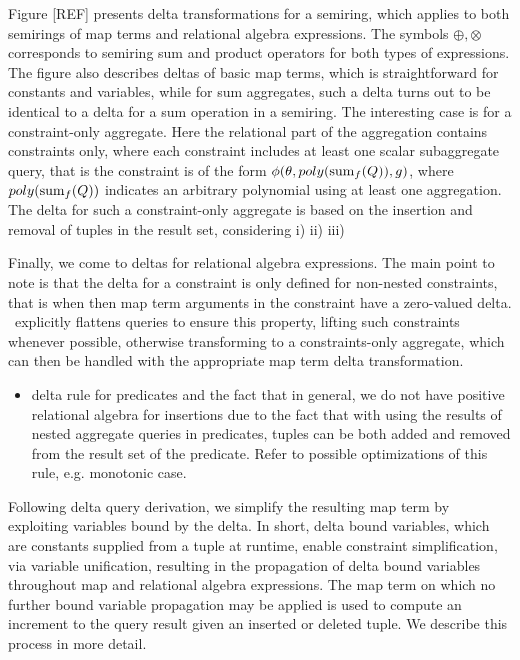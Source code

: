 Figure [REF] presents delta transformations for a semiring, which applies to
both semirings of map terms and relational algebra expressions. The symbols
$\oplus, \otimes$ corresponds to semiring sum and product operators for both
types of expressions. The figure also describes deltas of basic map terms, which
is straightforward for constants and variables, while for sum aggregates, such a
delta turns out to be identical to a delta for a sum operation in a
semiring. The interesting case is for a constraint-only aggregate. Here the
relational part of the aggregation contains constraints only, where each
constraint includes at least one scalar subaggregate query, that is the
constraint is of the form $\phi(\theta, poly(\mathrm{sum}_{f}(Q)), g)$, where 
$poly(\mathrm{sum}_f(Q))$ indicates an arbitrary polynomial using at least one
aggregation. The delta for such a constraint-only aggregate is based on the
insertion and removal of tuples in the result set, considering i) ii) iii)

Finally, we come to deltas for relational algebra expressions. The main point to
note is that the delta for a constraint is only defined for non-nested
constraints, that is when then map term arguments in the constraint have a
zero-valued delta. \compiler\ explicitly flattens queries to ensure this
property, lifting such constraints whenever possible, otherwise transforming to
a constraints-only aggregate, which can then be handled with the appropriate map
term delta transformation.

\begin{itemize}
\item delta rule for predicates and the fact that in general, we do not
  have positive relational algebra for insertions due to the fact that with
  using the results of nested aggregate queries in predicates, tuples can be
  both added and removed from the result set of the predicate. Refer to possible
  optimizations of this rule, e.g. monotonic case.
\end{itemize}

Following delta query derivation, we simplify the resulting map term by
exploiting variables bound by the delta. In short, delta bound variables, which
are constants supplied from a tuple at runtime, enable constraint
simplification, via variable unification, resulting in the propagation of delta
bound variables throughout map and relational algebra expressions. The map term
on which no further bound variable propagation may be applied is used to compute
an increment to the query result given an inserted or deleted tuple. We describe
this process in more detail.

